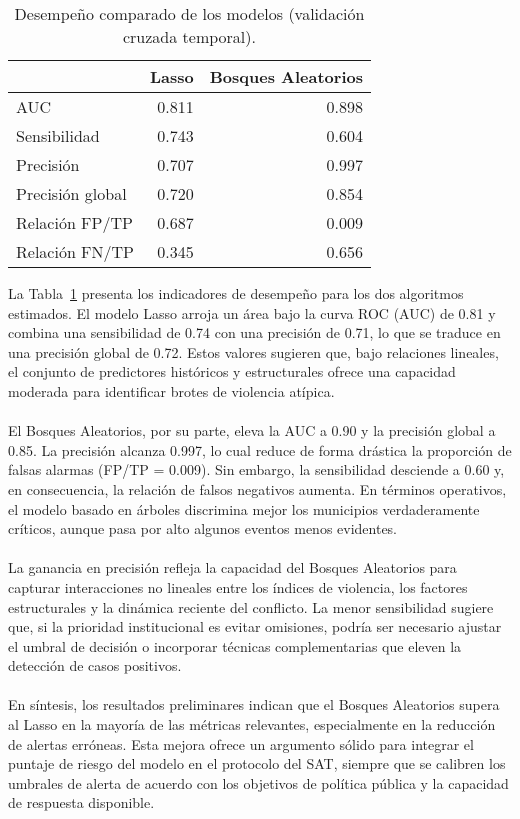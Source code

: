 \begin{table}[h]
\centering
\begin{tabular}{lrr}
\toprule
 & \textbf{Lasso} & \textbf{Bosques Aleatorios} \\
\midrule
AUC             & 0.811 & 0.898 \\
Sensibilidad    & 0.743 & 0.604 \\
Precisión   & 0.707 & 0.997 \\
Precisión global & 0.720 & 0.854 \\
Relación FP/TP  & 0.687 & 0.009 \\
Relación FN/TP  & 0.345 & 0.656 \\
\bottomrule
\end{tabular}
\caption{Desempeño comparado de los modelos (validación cruzada temporal).}
\label{tab:model_comparison}
\end{table}

La Tabla~\ref{tab:model_comparison} presenta los indicadores de desempeño para los dos algoritmos estimados. El modelo Lasso arroja un área bajo la curva ROC (AUC) de 0.81 y combina una sensibilidad de 0.74 con una precisión de 0.71, lo que se traduce en una precisión global de 0.72. Estos valores sugieren que, bajo relaciones lineales, el conjunto de predictores históricos y estructurales ofrece una capacidad moderada para identificar brotes de violencia atípica.
\\\\
El {Bosques Aleatorios}, por su parte, eleva la AUC a 0.90 y la precisión global a 0.85. La precisión alcanza 0.997, lo cual reduce de forma drástica la proporción de falsas alarmas (FP/TP = 0.009). Sin embargo, la sensibilidad desciende a 0.60 y, en consecuencia, la relación de falsos negativos aumenta. En términos operativos, el modelo basado en árboles discrimina mejor los municipios verdaderamente críticos, aunque pasa por alto algunos eventos menos evidentes.
\\\\
La ganancia en precisión refleja la capacidad del {Bosques Aleatorios} para capturar interacciones no lineales entre los índices de violencia, los factores estructurales y la dinámica reciente del conflicto. La menor sensibilidad sugiere que, si la prioridad institucional es evitar omisiones, podría ser necesario ajustar el umbral de decisión o incorporar técnicas complementarias que eleven la detección de casos positivos.
\\\\
En síntesis, los resultados preliminares indican que el {Bosques Aleatorios} supera al Lasso en la mayoría de las métricas relevantes, especialmente en la reducción de alertas erróneas. Esta mejora ofrece un argumento sólido para integrar el puntaje de riesgo del modelo en el protocolo del SAT, siempre que se calibren los umbrales de alerta de acuerdo con los objetivos de política pública y la capacidad de respuesta disponible.

